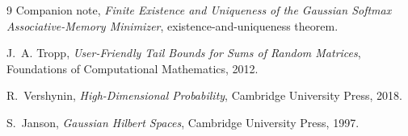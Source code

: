\documentclass[11pt]{article}
\theoremstyle{remark}
\newcommand{\1}{\mathbf 1}
\begin{document}
\begin{thebibliography}{9}
Companion note, \emph{Finite Existence and Uniqueness of the Gaussian
Softmax Associative-Memory Minimizer}, existence-and-uniqueness theorem.

J.~A. Tropp,
\emph{User-Friendly Tail Bounds for Sums of Random Matrices},
Foundations of Computational Mathematics, 2012.

R.~Vershynin,
\emph{High-Dimensional Probability},
Cambridge University Press, 2018.

S.~Janson,
\emph{Gaussian Hilbert Spaces},
Cambridge University Press, 1997.
\end{thebibliography}
\end{document}

